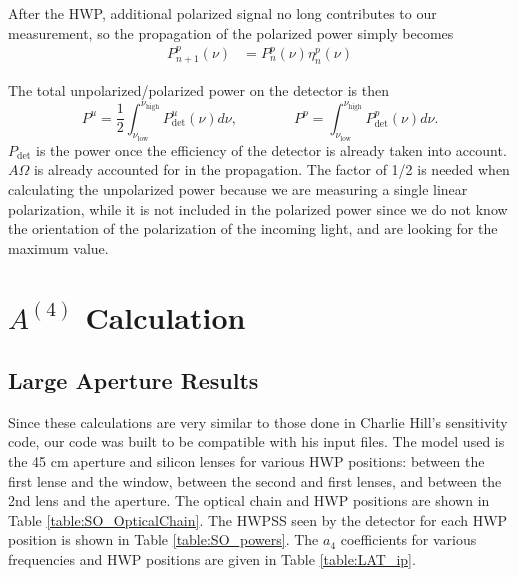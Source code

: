 \documentclass{article}
\theoremstyle{remark}
\newcommand{\tab}{\hspace*{2em}}
\renewcommand{\t}[1]{\text{#1}}
\newcommand{\AI}{A^{(4)}_{0|<I_{\t{in}}>}}
\newcommand{\A}[1]{A^{(#1)}}
\begin{document}
\tab After the HWP, additional polarized signal no long contributes to our measurement, 
so the propagation of the polarized power simply becomes
\begin{align}
P_{n+1}^p(\nu) &=  P_n^p(\nu) \eta_n^p(\nu) 
\end{align}

The total unpolarized/polarized power on the detector is then
\[
P^{u} = \frac{1}{2}\int_{\nu_\t{low}}^{\nu_\t{high}} P_\t{det}^u(\nu) d\nu,
\qquad \qquad
P^{p} = \int_{\nu_\t{low}}^{\nu_\t{high}} P_\t{det}^p(\nu) d\nu.
\]
$P_\t{det}$ is the power once the efficiency of the detector is already taken into account. 
$A\Omega$ is already accounted for in the propagation.
The factor of 1/2 is needed when calculating the unpolarized power because we are measuring a single linear polarization,
while it is not included in the polarized power since we do not know the orientation of the polarization of the incoming light, 
and are looking for the maximum value.



\section{$\A4$ Calculation}

\subsection{Large Aperture Results}

\tab Since these calculations are very similar to those done in Charlie Hill's sensitivity code,
our code was built to be compatible with his input files.
The model used is the 45 cm aperture and silicon lenses for various HWP positions:
between the first lense and the window, between the second and first lenses, and between the 2nd lens and the aperture.
The optical chain and HWP positions are shown in Table \ref{table:SO_OpticalChain}.
The HWPSS seen by the detector for each HWP position is shown in Table \ref{table:SO_powers}.
The $a_4$ coefficients for various frequencies and HWP positions are given in Table \ref{table:LAT_ip}.



%
\end{document}
